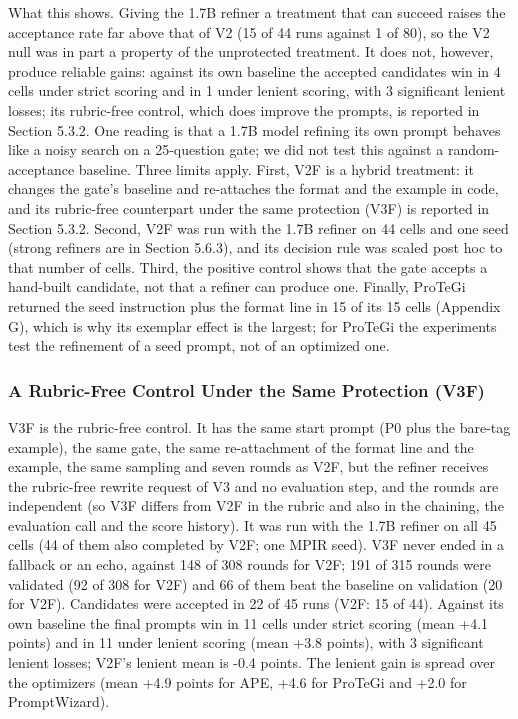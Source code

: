 \documentclass{ieeeaccess}
\begin{document}
What this shows. Giving the 1.7B refiner a treatment that can succeed raises the acceptance rate far above that of V2 (15 of 44 runs against 1 of 80), so the V2 null was in part a property of the unprotected treatment. It does not, however, produce reliable gains: against its own baseline the accepted candidates win in 4 cells under strict scoring and in 1 under lenient scoring, with 3 significant lenient losses; its rubric-free control, which does improve the prompts, is reported in Section 5.3.2. One reading is that a 1.7B model refining its own prompt behaves like a noisy search on a 25-question gate; we did not test this against a random-acceptance baseline. Three limits apply. First, V2F is a hybrid treatment: it changes the gate's baseline and re-attaches the format and the example in code, and its rubric-free counterpart under the same protection (V3F) is reported in Section 5.3.2. Second, V2F was run with the 1.7B refiner on 44 cells and one seed (strong refiners are in Section 5.6.3), and its decision rule was scaled post hoc to that number of cells. Third, the positive control shows that the gate accepts a hand-built candidate, not that a refiner can produce one. Finally, ProTeGi returned the seed instruction plus the format line in 15 of its 15 cells (Appendix G), which is why its exemplar effect is the largest; for ProTeGi the experiments test the refinement of a seed prompt, not of an optimized one.

\subsubsection{A Rubric-Free Control Under the Same Protection (V3F)}

V3F is the rubric-free control. It has the same start prompt (P0 plus the bare-tag example), the same gate, the same re-attachment of the format line and the example, the same sampling and seven rounds as V2F, but the refiner receives the rubric-free rewrite request of V3 and no evaluation step, and the rounds are independent (so V3F differs from V2F in the rubric and also in the chaining, the evaluation call and the score history). It was run with the 1.7B refiner on all 45 cells (44 of them also completed by V2F; one MPIR seed). V3F never ended in a fallback or an echo, against 148 of 308 rounds for V2F; 191 of 315 rounds were validated (92 of 308 for V2F) and 66 of them beat the baseline on validation (20 for V2F). Candidates were accepted in 22 of 45 runs (V2F: 15 of 44). Against its own baseline the final prompts win in 11 cells under strict scoring (mean +4.1 points) and in 11 under lenient scoring (mean +3.8 points), with 3 significant lenient losses; V2F's lenient mean is -0.4 points. The lenient gain is spread over the optimizers (mean +4.9 points for APE, +4.6 for ProTeGi and +2.0 for PromptWizard).
\end{document}
